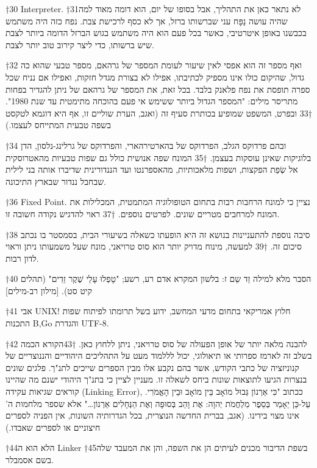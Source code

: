 †{30} Interpreter.
†{31}לא נתאר כאן את התהליך, אבל בסופו של יום, הוא דומה מאוד למה שהיה עושה נַפָּח עני שברשותו ברזל, אך לא כסף לרכישת צבת. נפח כזה היה משתמש בכבשנו באופן איטרטיבי, כאשר בכל פעם הוא היה משתמש בגוש הברזל הדומה ביותר לצבת שיש ברשותו, כדי ליצר קירוב טוב יותר לצבת.

†{32} ואף מספר זה הוא אפסי לאין שיעור לעומת המספר של גרהאם, מספר טבעי שהוא כה גדול, שהיקום כולו אינו מספיק לכתיבתו, אפילו לא בצורת מגדל חזקות, ואפילו אם נניח שכל ספרה תופסת את נפח פלאנק בלבד. בכל זאת, את המספר של גרהאם של ניתן להגדיר בפחות מתריסר מילים: "המספר הגדול ביותר ששימש אי פעם בהוכחה מתימטית עד שנת 1980".
†{33} ובפרט, המשפט שמופיע בכותרת סעיף זה (ואגב, הערת שוליים זו, אף היא דוגמא לטקסט בשפה טבעית המתייחס לעצמו.)

†{34} ובהם פרדוקס הגלב, הפרדוקס של בהארטירהארי, והפרדוקס של גרלינג-נלסון, הדן בלוגיקות שאינן עוסקות בעצמן.
†{35} המונח שפה אנושית כולל גם שפות טבעיות מהאטרוסקית אל שְׂפַת הפקצות, ושפות מלאכותיות, מהאספרנטו ועד הננדורינית שדיברו אותה בני לילית שבחבל ננדור שבארץ התיכונה.

†{36} Fixed Point. נציין כי למונח הרחבות רבות בתחום הטופולוגיה המתמטית, המכלילות את המונח למרחבים מטריים שונים. לפרטים נוספים.
†{37} ראוי להדגיש נקודה חשובה זו.

†{38} סיבה נוספת להתעניינות בנושא זה היא הופעתו כשאלה בשיעורי הבית, בסמסטר בו נכתב סיכום זה.
†{39} למעשה, מינוח מדויק יותר הוא סוס טרויאני, מונח שעל משמעותו ניתן וראוי לדון רבות.

†{40} הסבר מלא למילה זֵד שֵם ז: בלשון המקרא אדם רע, רשע; "טָפְלוּ עָלַי שֶׁקֶר זֵדִים" (תהלים קיט סט). [מילון רב-מילים]

†{41} אבי UNIX! חלוץ אמריקאי בתחום מדעי המחשב, ידוע בשל תרומתו לפיתוח שפות התכנות B,Go והגדרת UTF-8.

†{42} להבנה מלאה יותר של אופן הפעולה של סוס טרויאני, ניתן ללחוץ כאן.
†{43}הקורא הכמה בשלב זה לארמז ספרותי או תיאולוגי, יכול לללמוד מעט על התהליכים היהודיים והננוצריים של קנוניזציה של כתבי הקודש, אשר בהם נקבע אלו מבין הספרים שייכים לתנ"ך. פלגים שונים בנצרות הגיעו לתוצאות שונות ביחס לשאלה זו. מעניין לציין כי בתנ"ך היהודי ישנם מה שהיינו קוראים שגיאות עקידה (Linking Error), ככתוב "כִּי אַרְנוֹן גְּבוּל מוֹאָב בֵּין מוֹאָב וּבֵין הָאֱמֹרִי. עַל-כֵּן יֵאָמַר בְּסֵפֶר מִלְחֲמֹת יְהוָה: אֶת וָהֵב בְּסוּפָה וְאֶת הַנְּחָלִים אַרְנוֹן…" אלא שספר מלחמות ה' אינו מצוי בידינו. (אגב, בברית החדשה הנוצרית, בכל הגדרותיה השונות, אין הפניה לספרים חיצוניים או לספרים שאבדו.)

†{44}הלא הוא ה Linker
†{45}בשפת הדיבור מכנים לעיתים הן את השפה, והן את המעבד שלה בשם אסמבלר.

